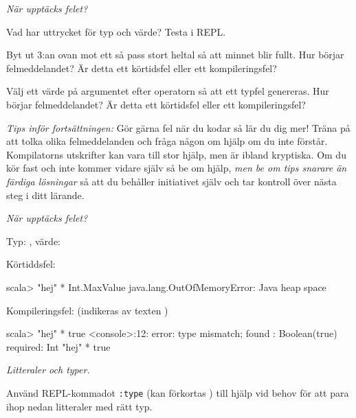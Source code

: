 \def\what{\emph{När upptäcks felet?}}

\QUESTBEGIN

\Task \what 

\Subtask Vad har uttrycket  för typ och värde? Testa i REPL.

\Subtask Byt ut 3:an ovan mot ett så pass stort heltal så att minnet blir fullt. Hur börjar felmeddelandet? Är detta ett körtidsfel eller ett kompileringsfel?

\Subtask Välj ett värde på argumentet efter operatorn \code{*} så att ett typfel genereras. Hur börjar felmeddelandet? Är detta ett körtidsfel eller ett kompileringsfel?

\begin{framed}
\noindent\emph{Tips inför fortsättningen:} Gör gärna fel när du kodar så lär du dig mer! Träna på att tolka olika felmeddelanden och fråga någon om hjälp om du inte förstår. Kompilatorns utskrifter kan vara till stor hjälp, men är ibland kryptiska. Om du kör fast och inte kommer vidare själv så be om hjälp, \emph{men be om tips snarare än färdiga lösningar} så att du behåller initiativet själv och tar kontroll över nästa steg i ditt lärande.
\end{framed}


\SOLUTION

\TaskSolved \what

\SubtaskSolved Typ: , värde: 

\SubtaskSolved Körtiddsfel:
\begin{REPLnonum}
scala> "hej" * Int.MaxValue
java.lang.OutOfMemoryError: Java heap space
\end{REPLnonum}

\SubtaskSolved Kompileringsfel: (indikeras av texten )
\begin{REPLnonum}
scala> "hej" * true
<console>:12: error: type mismatch;
 found   : Boolean(true)
 required: Int
       "hej" * true
\end{REPLnonum}


\QUESTEND




\def\what{\emph{Litteraler och typer.}}

\QUESTBEGIN

\Task \what

\Subtask Använd REPL-kommadot \verb+:type+ (kan förkortas ) till hjälp vid behov för att para ihop nedan litteraler med rätt typ. 

